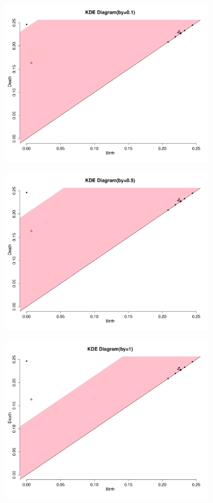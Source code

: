 \documentclass[a4paper]{article}
\begin{document}
\begin{figure}[htb!]
\begin{subfigure}{.32\textwidth}
  \includegraphics[width=\linewidth]{KDE-by0_1}
\end{subfigure}
\begin{subfigure}{.32\textwidth}
  \centering
  \includegraphics[width=\linewidth]{KDE-by0_5}
\end{subfigure}
\begin{subfigure}{.32\textwidth}
  \centering
  \includegraphics[width=\linewidth]{KDE-by1}

\end{subfigure}
\end{figure}
\end{document}
